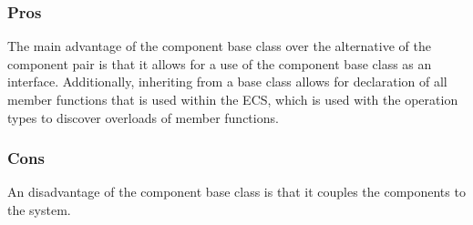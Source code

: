 \subsubsection{Pros}
The main advantage of the component base class over the alternative of the component pair is that it allows
for a use of the component base class as an interface.
Additionally, inheriting from a base class allows for declaration of all member functions that is used within the ECS,
which is used with the operation types to discover overloads of member functions.

\subsubsection{Cons}
An disadvantage of the component base class is that it couples the components to the system.
